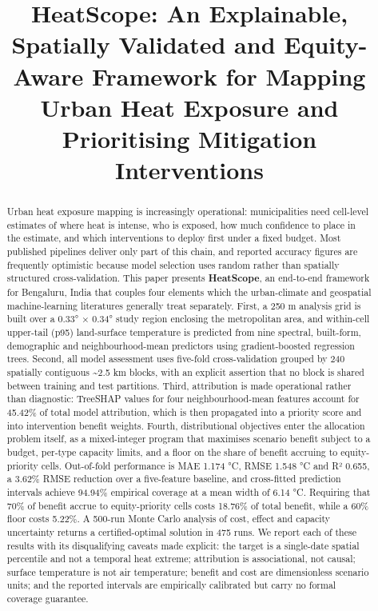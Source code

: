 \documentclass[conference]{IEEEtran}
\begin{document}
\title{HeatScope: An Explainable, Spatially Validated and Equity-Aware Framework for Mapping Urban Heat Exposure and Prioritising Mitigation Interventions}
\author{
}
\maketitle
\begin{abstract}
Urban heat exposure mapping is increasingly operational: municipalities need cell-level estimates of
where heat is intense, who is exposed, how much confidence to place in the estimate, and which
interventions to deploy first under a fixed budget. Most published pipelines deliver only part of
this chain, and reported accuracy figures are frequently optimistic because model selection uses
random rather than spatially structured cross-validation. This paper presents \textbf{HeatScope}, an
end-to-end framework for Bengaluru, India that couples four elements which the urban-climate and
geospatial machine-learning literatures generally treat separately. First, a 250 m analysis grid is
built over a 0.33° × 0.34° study region enclosing the metropolitan area, and within-cell upper-tail
(p95) land-surface temperature is predicted from nine spectral, built-form, demographic and
neighbourhood-mean predictors using gradient-boosted regression trees. Second, all model assessment uses five-fold
cross-validation grouped by 240 spatially contiguous \textasciitilde2.5 km blocks, with an explicit assertion that
no block is shared between training and test partitions. Third, attribution is made operational
rather than diagnostic: TreeSHAP values for four neighbourhood-mean features account for 45.42\% of
total model attribution, which is then propagated into a priority score and into intervention
benefit weights. Fourth, distributional objectives enter the allocation problem itself, as a
mixed-integer program that maximises scenario benefit subject to a budget, per-type capacity limits,
and a floor on the share of benefit accruing to equity-priority cells. Out-of-fold performance is
MAE 1.174 °C, RMSE 1.548 °C and R² 0.655, a 3.62\% RMSE reduction over a five-feature baseline, and
cross-fitted prediction intervals achieve 94.94\% empirical coverage at a mean width of 6.14 °C.
Requiring that 70\% of benefit accrue to equity-priority cells costs 18.76\% of total benefit, while a
60\% floor costs 5.22\%. A 500-run Monte Carlo analysis of cost, effect and capacity uncertainty
returns a certified-optimal solution in 475 runs. We report each of these results with its
disqualifying caveats made explicit: the target is a single-date spatial percentile and not a
temporal heat extreme; attribution is associational, not causal; surface temperature is not air
temperature; benefit and cost are dimensionless scenario units; and the reported intervals are
empirically calibrated but carry no formal coverage guarantee.
\end{abstract}
\end{document}
